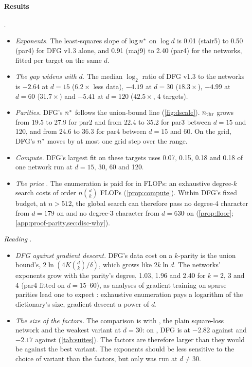 \paragraph{Results} .
\begin{itemize}
\item \emph{Exponents.} The least-squares slope of $\log n^{*}$ on $\log d$ is 0.01 (stair5) to 0.50 (par4) for DFG v1.3 alone, and 0.91 (maj9) to 2.40 (par4) for the networks, fitted per target on the same $d$.
\item \emph{The gap widens with $d$.} The median $\log_2$ ratio of DFG v1.3 to the networks is $-2.64$ at $d=15$ ($6.2\times$ less data), $-4.19$ at $d=30$ ($18.3\times$), $-4.99$ at $d=60$ ($31.7\times$) and $-5.41$ at $d=120$ ($42.5\times$, 4 targets).
\item \emph{Parities.} DFG's $n^{*}$ follows the union-bound line (\cref{fig:dscale}). $n_{\rm thr}$ grows from 19.5 to 27.9 for par2 and from 22.4 to 35.2 for par3 between $d=15$ and 120, and from 24.6 to 36.3 for par4 between $d=15$ and 60. On the grid, DFG's $n^{*}$ moves by at most one grid step over the range.
\item \emph{Compute.} DFG's largest fit on these targets uses 0.07, 0.15, 0.18 and 0.18 of one network run at $d=15$, 30, 60 and 120.
\item \emph{The price} . The enumeration is paid for in FLOPs: an exhaustive degree-$k$ search costs of order $n\binom dk$ FLOPs (\cref{prop:compute}). Within DFG's fixed budget, at $n>512$, the global search can therefore pass no degree-4 character from $d=179$ on and no degree-3 character from $d=630$ on (\cref{prop:floor}; \cref{app:proof-parity,sec:disc-why}).
\end{itemize}

\emph{Reading} .
\begin{itemize}
\item \emph{DFG against gradient descent.} DFG's data cost on a $k$-parity is the union bound's, $2\ln(4K\binom{d}{k}/\delta)$, which grows like $2k\ln d$. The networks' exponents grow with the parity's degree, 1.03, 1.96 and 2.40 for $k=2$, 3 and 4 (par4 fitted on $d=15$--60), as analyses of gradient training on sparse parities lead one to expect \cite{barak2022hidden,abbe2023leap}: exhaustive enumeration pays a logarithm of the dictionary's size, gradient descent a power of $d$.
\item \emph{The size of the factors.} The comparison is with , the plain square-loss network and the weakest variant at $d=30$: on , DFG is at $-2.82$ against  and $-2.17$ against  (\cref{tab:suites}). The factors are therefore larger than they would be against the best variant. The exponents should be less sensitive to the choice of variant than the factors, but only  was run at $d\ne30$.
\end{itemize}


